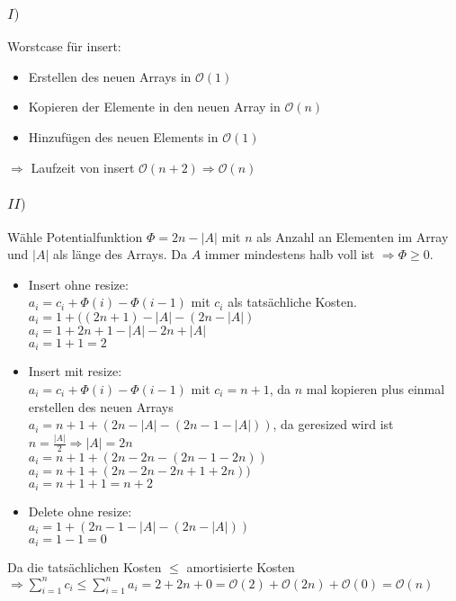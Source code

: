 \documentclass[a4paper]{scrartcl}
\begin{document}
\subsubsection*{$I)$}
Worstcase für insert:
\begin{itemize}
	\item Erstellen des neuen Arrays in $\mathcal{O}(1)$
	\item Kopieren der Elemente in den neuen Array in $\mathcal{O}(n)$
	\item Hinzufügen des neuen Elements in $\mathcal{O}(1)$
\end{itemize}
$\Rightarrow$ Laufzeit von insert $\mathcal{O}(n + 2) \Rightarrow \mathcal{O}(n)$
\subsubsection*{$II)$}
Wähle Potentialfunktion $\Phi = 2n - |A|$ mit $n$ als Anzahl an Elementen im Array und $|A|$ als länge des Arrays. Da $A$ immer mindestens halb voll ist $\Rightarrow \Phi \geq 0$.

\begin{itemize}
	\item Insert ohne resize:\\
		$a_i = c_i + \Phi(i) - \Phi(i-1)$ mit $c_i$ als tatsächliche Kosten.\\
		$a_i = 1 + ((2n+1) - |A| - (2n - |A|)$\\
		$a_i = 1 + 2n+1 - |A| -2n + |A|$\\
		$a_i = 1 + 1 = 2$
	\item  Insert mit resize:\\
		$a_i = c_i + \Phi(i) - \Phi(i-1)$ mit $c_i = n +1$, da $n$ mal kopieren plus einmal erstellen des neuen Arrays\\
		$a_i = n+1 + (2n-|A| - (2n-1-|A|))$, da geresized wird ist $n = \frac{|A|}{2} \Rightarrow |A|=2n$\\
		$a_i = n+1+ (2n - 2n - (2n - 1 -2n))$\\
		$a_i = n+1+ (2n - 2n - 2n + 1 +2n))$\\
		$a_i = n+1 + 1 = n+2$
	\item Delete ohne resize:\\
		$a_i = 1 + (2n-1-|A| - (2n - |A|))$\\
		$a_i = 1 -1 = 0$\\
\end{itemize}
Da die tatsächlichen Kosten $\leq$ amortisierte Kosten\\
$\Rightarrow \sum_{i=1}^{n} c_i \le \sum_{i=1}^{n} a_i = 2+2n+0 = \mathcal{O}(2) + \mathcal{O}(2n) + \mathcal{O}(0) = \mathcal{O}(n)$
\end{document}
